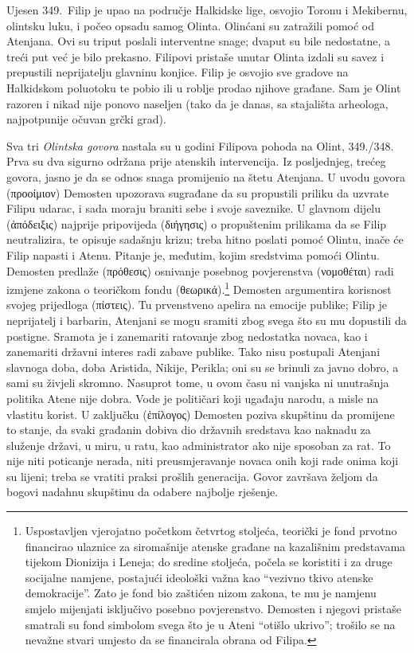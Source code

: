 Ujesen 349.\ Filip je upao na područje Halkidske lige, osvojio Toronu i Mekibernu, olintsku luku, i počeo opsadu samog Olinta. Olinćani su zatražili pomoć od Atenjana. Ovi su triput poslali interventne snage; dvaput su bile nedostatne, a treći put već je bilo prekasno. Filipovi pristaše unutar Olinta izdali su savez i prepustili neprijatelju glavninu konjice. Filip je osvojio sve gradove na Halkidskom poluotoku te pobio ili u roblje prodao njihove građane. Sam je Olint razoren i nikad nije ponovo naseljen (tako da je danas, sa stajališta arheologa, najpotpunije očuvan grčki grad).

Sva tri \textit{Olintska govora} nastala su u godini Filipova pohoda na Olint, 349./348. Prva su dva sigurno održana prije atenskih intervencija. Iz posljednjeg, trećeg govora, jasno je da se odnos snaga promijenio na štetu Atenjana. U uvodu govora \textgreek[variant=ancient]{(προοίμιον)} Demosten upozorava sugrađane da su propustili priliku da uzvrate Filipu udarac, i sada moraju braniti sebe i svoje saveznike. U glavnom dijelu \textgreek[variant=ancient]{(ἀπόδειξις)} najprije pripovijeda  \textgreek[variant=ancient]{(διήγησις)} o propuštenim prilikama da se Filip neutralizira, te opisuje sadašnju krizu; treba hitno poslati pomoć Olintu, inače će Filip napasti i Atenu. Pitanje je, međutim, kojim sredstvima pomoći Olintu. Demosten predlaže \textgreek[variant=ancient]{(πρόθεσις)} osnivanje posebnog povjerenstva \textgreek[variant=ancient]{(νομοθέται)} radi izmjene zakona o teoričkom fondu \textgreek[variant=ancient]{(θεωρικά).}\footnote{Uspostavljen vjerojatno početkom četvrtog stoljeća, teorički je fond prvotno financirao ulaznice za siromašnije atenske građane na kazališnim predstavama tijekom Dionizija i Leneja; do sredine stoljeća, počela se koristiti i za druge socijalne namjene, postajući ideološki važna kao ``vezivno tkivo atenske demokracije''. Zato je fond bio zaštićen nizom zakona, te mu je namjenu smjelo mijenjati isključivo posebno povjerenstvo. Demosten i njegovi pristaše smatrali su fond simbolom svega što je u Ateni ``otišlo ukrivo''; trošilo se na nevažne stvari umjesto da se financirala obrana od Filipa.} Demosten argumentira korisnost svojeg prijedloga \textgreek[variant=ancient]{(πίστεις).} Tu prvenstveno apelira na emocije publike; Filip je neprijatelj i barbarin, Atenjani se mogu sramiti zbog svega što su mu dopustili da postigne. Sramota je i zanemariti ratovanje zbog nedostatka novaca, kao i zanemariti državni interes radi zabave publike. Tako nisu postupali Atenjani slavnoga doba, doba Aristida, Nikije, Perikla; oni su se brinuli za javno dobro, a sami su živjeli skromno. Nasuprot tome, u ovom času ni vanjska ni unutrašnja politika Atene nije dobra. Vode je političari koji ugađaju narodu, a misle na vlastitu korist. U zaključku \textgreek[variant=ancient]{(ἐπίλογος)} Demosten poziva skupštinu da promijene to stanje, da svaki građanin dobiva dio državnih sredstava kao naknadu za služenje državi, u miru, u ratu, kao administrator ako nije sposoban za rat. To nije niti poticanje nerada, niti preusmjeravanje novaca onih koji rade onima koji su lijeni; treba se vratiti praksi prošlih generacija. Govor završava željom da bogovi nadahnu skupštinu da odabere najbolje rješenje.

